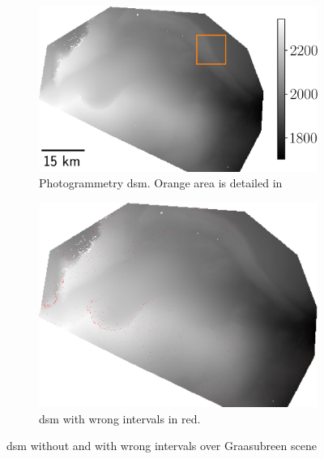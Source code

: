 \begin{figure}
    \begin{subfigure}[t]{0.553\linewidth}
        \flushleft
        \includegraphics[width=\linewidth]{Images/Chap_6/Graasubreen_dsm.png}
        \caption{Photogrammetry \acrshort{dsm}. Orange area is detailed in }
        \label{fig:Graasubreen_dsm}
    \end{subfigure}
    \begin{subfigure}[t]{0.447\linewidth}
        \flushright
        \includegraphics[width=\linewidth]{Images/Chap_6/Graasubreen_error.png}
        \caption{\acrshort{dsm} with wrong intervals in red.}
        \label{fig:Graasubreen_error}
    \end{subfigure}
    \caption{\acrshort{dsm} without and with wrong intervals over Graasubreen scene}
    \label{fig:Graasubreen_global}
\end{figure}

